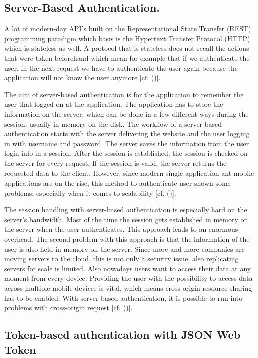 \subsection{Server-Based Authentication.}
A lot of modern-day API’s built on the Representational State Transfer (REST) programming paradigm which basis is the Hypertext Transfer Protocol (HTTP) which is stateless as well. A protocol that is stateless does not recall the actions that were taken beforehand which mean for example that if we authenticate the user, in the next request we have to authenticate the user again because the application will not know the user anymore [cf. (\cite{Serilleja:2015:Scothio})]. 

The aim of server-based authentication is for the application to remember the user that logged on at the application. The application has to store the information on the server, which can be done in a few different ways during the session, usually in memory on the disk. The workflow of a server-based authentication starts with the server delivering the website and the user logging in with username and password. The server saves the information from the user login info in a session. After the session is established, the session is checked on the server for every request. If the session is valid, the server returns the requested data to the client. However, since modern single-application ant mobile applications are on the rise, this method to authenticate user shown some problems, especially when it comes to scalability [cf. (\cite{Serilleja:2015:Scothio})]. 

The session handling with server-based authentication is especially hard on the server’s bandwidth. Most of the time the session gets established in memory on the server when the user authenticates. This approach leads to an enormous overhead. The second problem with this approach is that the information of the user is also held in memory on the server. Since more and more companies are moving servers to the cloud, this is not only a security issue, also replicating servers for scale is limited. Also nowadays users want to access their data at any moment from every device. Providing the user with the possibility to access data across multiple mobile devices is vital, which means cross-origin resource sharing has to be enabled. With server-based authentication, it is possible to run into problems with cross-origin request [cf. (\cite{Serilleja:2015:Scothio})].


\subsection{
	Token-based authentication with JSON Web Token
}

